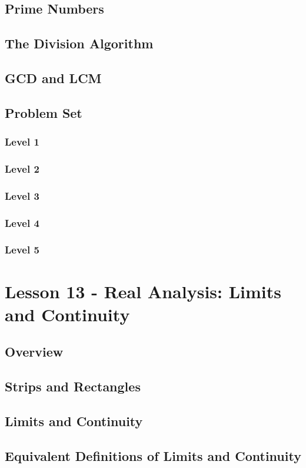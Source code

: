 \documentclass{article}
\begin{document}
\subsection{Prime Numbers}
\subsection{The Division Algorithm}
\subsection{GCD and LCM}
\subsection{Problem Set}
\subsubsection{Level 1}
\subsubsection{Level 2}
\subsubsection{Level 3}
\subsubsection{Level 4}
\subsubsection{Level 5}
\pagebreak

\section{Lesson 13 - Real Analysis: Limits and Continuity}
\subsection{Overview}
\subsection{Strips and Rectangles}
\subsection{Limits and Continuity}
\subsection{Equivalent Definitions of Limits and Continuity}
\end{document}
